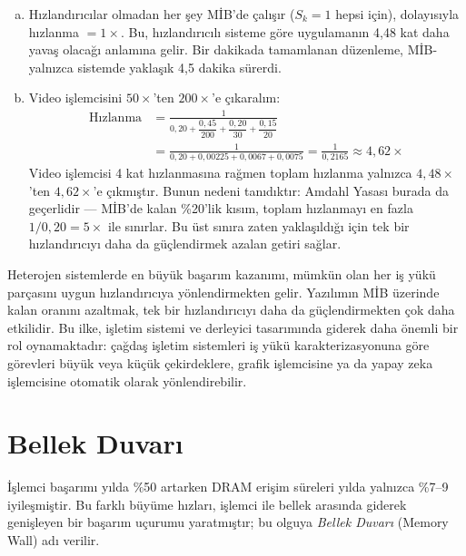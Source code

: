 \begin{ornek}[2.12]
\begin{enumerate}[(a)]
    \item Hızlandırıcılar olmadan her şey MİB'de çalışır ($S_k = 1$ hepsi için), dolayısıyla hızlanma $= 1\times$. Bu, hızlandırıcılı sisteme göre uygulamanın 4,48 kat daha yavaş olacağı anlamına gelir. Bir dakikada tamamlanan düzenleme, MİB-yalnızca sistemde yaklaşık 4,5 dakika sürerdi.

    \item Video işlemcisini $50\times$'ten $200\times$'e çıkaralım:
    \begin{align*}
    \text{Hızlanma} &= \frac{1}{0{,}20 + \dfrac{0{,}45}{200} + \dfrac{0{,}20}{30} + \dfrac{0{,}15}{20}} \\[6pt]
    &= \frac{1}{0{,}20 + 0{,}00225 + 0{,}0067 + 0{,}0075}
    = \frac{1}{0{,}2165}
    \approx 4{,}62\times
    \end{align*}
    Video işlemcisi 4 kat hızlanmasına rağmen toplam hızlanma yalnızca $4{,}48\times$'ten $4{,}62\times$'e çıkmıştır. Bunun nedeni tanıdıktır: Amdahl Yasası burada da geçerlidir --- MİB'de kalan \%20'lik kısım, toplam hızlanmayı en fazla $1/0{,}20 = 5\times$ ile sınırlar. Bu üst sınıra zaten yaklaşıldığı için tek bir hızlandırıcıyı daha da güçlendirmek azalan getiri sağlar.
\end{enumerate}
\end{ornek}

\begin{bilginot}
Heterojen sistemlerde en büyük başarım kazanımı, mümkün olan her iş yükü parçasını uygun hızlandırıcıya yönlendirmekten gelir. Yazılımın MİB üzerinde kalan oranını azaltmak, tek bir hızlandırıcıyı daha da güçlendirmekten çok daha etkilidir. Bu ilke, işletim sistemi ve derleyici tasarımında giderek daha önemli bir rol oynamaktadır: çağdaş işletim sistemleri iş yükü karakterizasyonuna göre görevleri büyük veya küçük çekirdeklere, grafik işlemcisine ya da yapay zeka işlemcisine otomatik olarak yönlendirebilir.
\end{bilginot}


\section{Bellek Duvarı}
\label{sec:bellek-duvari}

İşlemci başarımı yılda \%50 artarken DRAM erişim süreleri yılda yalnızca \%7--9 iyileşmiştir. Bu farklı büyüme hızları, işlemci ile bellek arasında giderek genişleyen bir başarım uçurumu yaratmıştır; bu olguya \emph{Bellek Duvarı} (Memory Wall) adı verilir.

